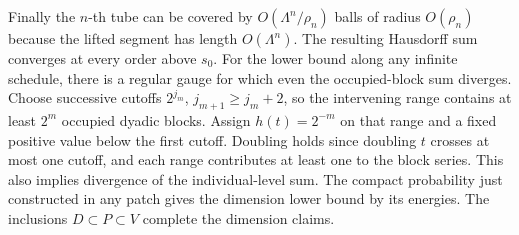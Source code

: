 \documentclass[11pt,a4paper,reqno]{amsart}
\theoremstyle{definition}
\theoremstyle{remark}
\numberwithin{equation}{section}
\begin{document}
Finally the \(n\)-th tube can be covered by \(O(\Lambda^n/\rho_n)\) balls of radius \(O(\rho_n)\) because the lifted segment has length \(O(\Lambda^n)\). The resulting Hausdorff sum converges at every order above \(s_0\). For the lower bound along any infinite schedule, there is a regular gauge for which even the occupied-block sum diverges. Choose successive cutoffs \(2^{j_m}\), \(j_{m+1}\ge j_m+2\), so the intervening range contains at least \(2^m\) occupied dyadic blocks. Assign \(h(t)=2^{-m}\) on that range and a fixed positive value below the first cutoff. Doubling holds since doubling \(t\) crosses at most one cutoff, and each range contributes at least one to the block series. This also implies divergence of the individual-level sum. The compact probability just constructed in any patch gives the dimension lower bound by its energies. The inclusions \(D\subset P\subset V\) complete the dimension claims.
\end{document}
